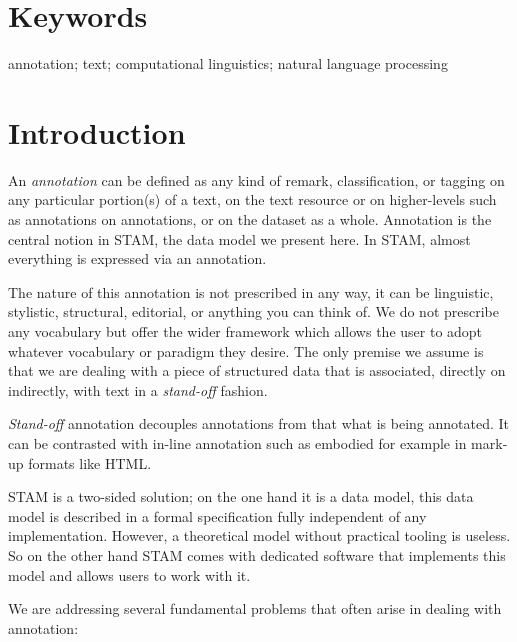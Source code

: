 \documentclass{jors}
\begin{document}
\section*{Keywords}

annotation; text; computational linguistics; natural language processing

\section*{Introduction}

An \emph{annotation} can be defined as any kind of remark, classification, or
tagging on any particular portion(s) of a text, on the text resource or on
higher-levels such as annotations on annotations, or on the dataset as a whole.
Annotation is the central notion in STAM, the data model we present here. In STAM,
almost everything is expressed via an annotation.

The nature of this annotation is not prescribed in any way, it can be
linguistic, stylistic, structural, editorial, or anything you can think of. We
do not prescribe any vocabulary but offer the wider framework which allows the
user to adopt whatever vocabulary or paradigm they desire. The only premise we
assume is that we are dealing with a piece of structured data that is
associated, directly on indirectly, with text in a \emph{stand-off} fashion.

\emph{Stand-off} annotation decouples annotations from that what is being
annotated. It can be contrasted with in-line annotation such as embodied for
example in mark-up formats like HTML. 

STAM is a two-sided solution; on the one hand it is a data model, this data
model is described in a formal specification fully independent of any implementation.
However, a theoretical model without practical tooling is useless. So on the
other hand STAM comes with dedicated software that implements this model and
allows users to work with it.

We are addressing several fundamental problems that often arise in dealing with annotation:
\end{document}
